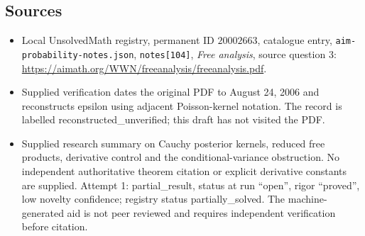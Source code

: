 \documentclass[11pt]{article}
\begin{document}
\subsection{Sources}
\begin{itemize}
\item Local UnsolvedMath registry, permanent ID \(20002663\), catalogue entry, \texttt{aim-probability-notes.json}, \texttt{notes[104]}, \emph{Free analysis}, source question 3: \url{https://aimath.org/WWN/freeanalysis/freeanalysis.pdf}.
\item Supplied verification dates the original PDF to August 24, 2006 and reconstructs epsilon using adjacent Poisson-kernel notation. The record is labelled reconstructed\_unverified; this draft has not visited the PDF.
\item Supplied research summary on Cauchy posterior kernels, reduced free products, derivative control and the conditional-variance obstruction. No independent authoritative theorem citation or explicit derivative constants are supplied. Attempt 1: partial\_result, status at run ``open'', rigor ``proved'', low novelty confidence; registry status partially\_solved. The machine-generated aid is not peer reviewed and requires independent verification before citation.
\end{itemize}
\end{document}
